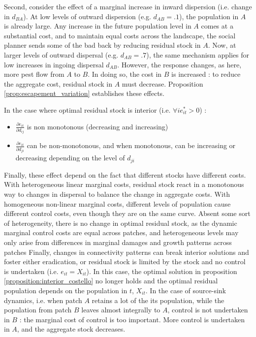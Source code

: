 Second, consider the effect of a marginal increase in inward dispersion (i.e. change in $d_{BA}$). At low levels of outward dispersion (e.g. $d_{AB} = .1$), the population in $A$ is already large. Any increase in the future population level in $A$ comes at a substantial cost, and to maintain equal costs across the landscape, the social planner sends some of the bad back by reducing residual stock in $A$. Now, at larger levels of outward dispersal (e.g. $d_{AB} = .7$), the same mechanism applies for low increases in ingoing dispersal $d_{AB}$. However, the response changes, as here, more pest flow from $A$ to $B$. In doing so, the cost in $B$ is increased : to reduce the aggregate cost, residual stock in $A$ must decrease. Proposition \ref{prop:escapement_variation} establishes these effects. 
\begin{proposition}
\label{prop:escapement_variation}
In the case where optimal residual stock is interior (i.e. $\forall i e^*_{it}>0$) :
\begin{itemize}
\item $\frac{\partial e_{it}}{\partial d_{ij}}$ is non monotonous (decreasing and increasing)
\item $\frac{\partial e_{it}}{\partial d_{ji}}$ can be non-monotonous, and when monotonous, can be increasing or decreasing depending on the level of $d_{ji}$
\end{itemize}
\end{proposition}
Finally, these effect depend on the fact that different stocks have different costs. With heterogeneous linear marginal costs, residual stock react in a monotonous way to changes in dispersal to balance the change in aggregate costs. With homogeneous non-linear marginal costs, different levels of population cause different control costs, even though they are on the same curve. Absent some sort of heterogeneity, there is no change in optimal residual stock, as the dynamic marginal control costs are equal across patches, and heterogeneous levels may only arise from differences in marginal damages and growth patterns across patches
%
Finally, changes in connectivity patterns can break interior solutions and foster either eradication, or residual stock is limited by the stock and no control is undertaken (i.e. $e_{it}=X_{it}$). In this case, the optimal solution in proposition \ref{proposition:interior_costello} no longer holds and the optimal residual population depends on the population in $t$, $X_{it}$. In the case of source-sink dynamics, i.e. when patch $A$ retains a lot of the its population, while the population from patch $B$ leaves almost integrally to $A$, control is not undertaken in $B$ : the marginal cost of control is too important. More control is undertaken in $A$, and the aggregate stock decreases. 

